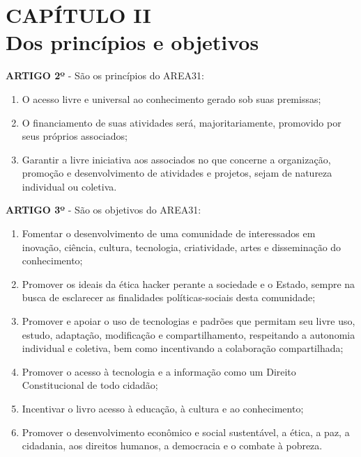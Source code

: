 \chapter*{CAPÍTULO II \\ Dos princípios e objetivos}


\textbf{ARTIGO 2º} - São os princípios do AREA31:

\begin{enumerate}[label=\Roman* -]
    \item O acesso livre e universal ao conhecimento gerado 
          sob suas premissas;
    \item O financiamento de suas atividades será, majoritariamente, 
          promovido por seus próprios associados;
    \item Garantir a livre iniciativa aos associados no que concerne a 
          organização, promoção e desenvolvimento de atividades e 
          projetos, sejam de natureza individual ou coletiva.
\end{enumerate}


\textbf{ARTIGO 3º} - São os objetivos do AREA31:

\begin{enumerate}[label=\Roman* -]
    \item Fomentar o desenvolvimento de uma comunidade de interessados em 
          inovação, ciência, cultura, tecnologia, criatividade, artes 
          e disseminação do conhecimento;
    \item Promover os ideais da ética hacker perante a sociedade e o 
          Estado, sempre na busca de esclarecer as finalidades 
          políticas-sociais desta comunidade;
    \item Promover e apoiar o uso de tecnologias e padrões que permitam 
          seu livre uso, estudo, adaptação, modificação e compartilhamento, 
          respeitando a autonomia individual e coletiva, bem como 
          incentivando a colaboração compartilhada;
    \item Promover o acesso à tecnologia e a informação como um Direito 
           Constitucional de todo cidadão;
    \item Incentivar o livro acesso à educação, à cultura e ao conhecimento;
    \item Promover o desenvolvimento econômico e social sustentável, a 
          ética, a paz, a cidadania, aos direitos humanos, a democracia e o 
          combate à pobreza.
\end{enumerate}


